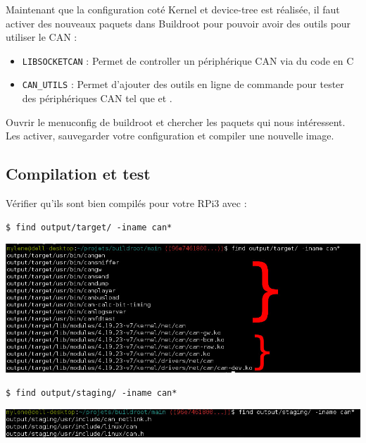 Maintenant que la configuration coté Kernel et device-tree est réalisée, il
faut activer des nouveaux paquets dans Buildroot pour pouvoir avoir des
outils pour utiliser le CAN :
\begin{itemize}
\item \texttt{LIBSOCKETCAN} : Permet de controller un périphérique CAN via du code en C
\item \texttt{CAN\_UTILS} : Permet d'ajouter des outils en ligne de commande pour
  tester des périphériques CAN tel que  et .
\end{itemize}

Ouvrir le menuconfig de buildroot et chercher les paquets qui nous intéressent.
Les activer, sauvegarder votre configuration et compiler une nouvelle image.

\subsection{Compilation et test}

Vérifier qu'ils sont bien compilés pour votre RPi3 avec :

\begin{verbatim}
$ find output/target/ -iname can*
\end{verbatim}

\begin{centering}
\includegraphics[height=0.2\textheight]{pictures/04_labs/output_target.jpg} \\
\end{centering}

\begin{verbatim}
$ find output/staging/ -iname can*
\end{verbatim}

\begin{centering}
\includegraphics[height=0.05\textheight]{pictures/04_labs/output_staging.jpg} \\
\end{centering}

